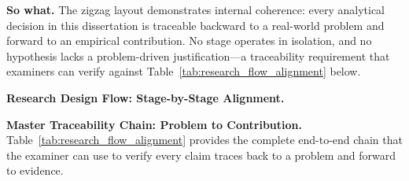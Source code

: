 \noindent\textbf{So what.} The zigzag layout demonstrates internal coherence: every analytical decision in this dissertation is traceable backward to a real-world problem and forward to an empirical contribution. No stage operates in isolation, and no hypothesis lacks a problem-driven justification---a traceability requirement that examiners can verify against Table~\ref{tab:research_flow_alignment} below.
\fi

\noindent\textbf{Research Design Flow: Stage-by-Stage Alignment.}

\noindent\textbf{Master Traceability Chain: Problem to Contribution.} Table~\ref{tab:research_flow_alignment} provides the complete end-to-end chain that the examiner can use to verify every claim traces back to a problem and forward to evidence.

